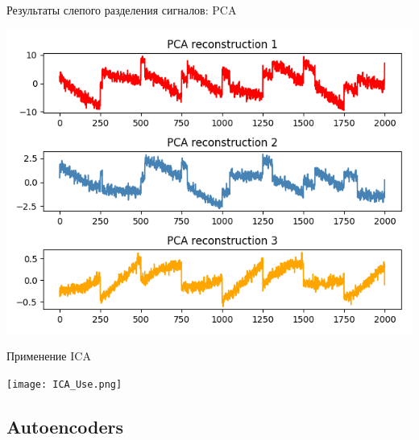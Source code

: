 \documentclass[pdf, intlimits, 9pt, unicode]{beamer}
\begin{document}
\begin{frame}{Результаты слепого разделения сигналов: PCA}\begin{center}\includegraphics[height=\textheight]{src/3_H.png}\end{center}\end{frame}






\begin{frame}{Применение ICA}\begin{center}\texttt{[image: ICA\_Use.png]}\end{center}\end{frame}





\subsection{Autoencoders}
\end{document}
